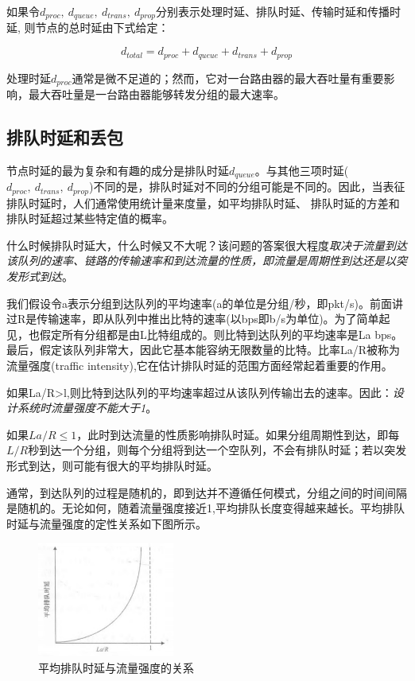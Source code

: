     如果令$d_{proc},\ d_{queue},\ d_{trans},\ d_{prop}$分别表示处理时延、排队时延、传输时延和传播时延, 则节点的总时延由下式给定：

$$
    d_{total} = d_{proc} + d_{queue} + d_{trans} + d_{prop}
$$

    处理时延$d_{proc}$通常是微不足道的；然而，它对一台路由器的最大吞吐量有重要影响，最大吞吐量是一台路由器能够转发分组的最大速率。

\subsection{排队时延和丢包}

    节点时延的最为复杂和有趣的成分是排队时延$d_{queue}$。与其他三项时延($d_{proc},\ d_{trans},\ d_{prop}$)不同的是，排队时延对不同的分组可能是不同的。因此，当表征排队时延时，人们通常使用统计量来度量，如平均排队时延、 排队时延的方差和排队时延超过某些特定值的概率。

    什么时候排队时延大，什么时候又不大呢？该问题的答案很大程度\emph{取决于流量到达该队列的速率、链路的传输速率和到达流量的性质，即流量是周期性到达还是以突发形式到达}。

    我们假设令a表示分组到达队列的平均速率(a的单位是分组/秒，即pkt/s)。前面讲过R是传输速率，即从队列中推出比特的速率(以bps即b/s为单位)。为了简单起见，也假定所有分组都是由L比特组成的。则比特到达队列的平均速率是La bps。最后，假定该队列非常大，因此它基本能容纳无限数量的比特。比率La/R被称为流量强度(traffic intensity),它在估计排队时延的范围方面经常起着重要的作用。

    如果La/R>l,则比特到达队列的平均速率超过从该队列传输岀去的速率。因此：\emph{设计系统时流量强度不能大于1}。

    如果$La/R \le 1$，此时到达流量的性质影响排队时延。如果分组周期性到达，即每$L/R$秒到达一个分组，则每个分组将到达一个空队列，不会有排队时延；若以突发形式到达，则可能有很大的平均排队时延。

    通常，到达队列的过程是随机的，即到达并不遵循任何模式，分组之间的时间间隔是随机的。无论如何，随着流量强度接近1,平均排队长度变得越来越长。平均排队时延与流量强度的定性关系如下图所示。

\begin{figure}[!htbp]
    \centering
    \includegraphics[width=0.4\textwidth]{image/chapter01/平均时延与流量强度的关系.png}
    \caption{平均排队时延与流量强度的关系}
\end{figure}

